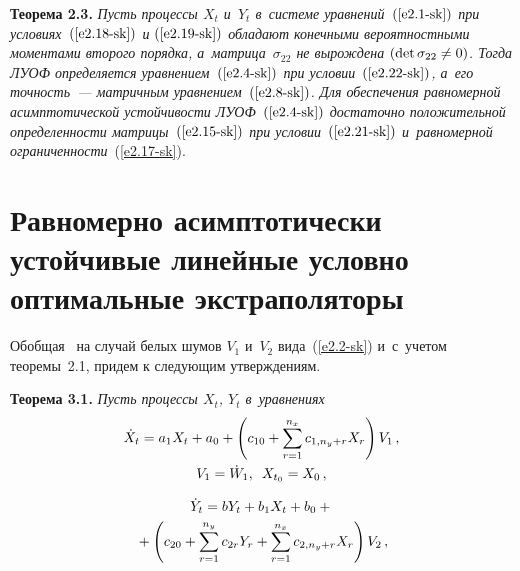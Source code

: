 \begin{multicols}{2}
\noindent
\textbf{Теорема 2.3.} \textit{Пусть процессы  $X_t$ и~$Y_t$ в~системе
уравнений~$(\ref{e2.1-sk})$ при условиях~$(\ref{e2.18-sk})$ и
$(\ref{e2.19-sk})$ обладают конечными вероятностными моментами второго порядка,
а~мат\-ри\-ца~$\sigma_{22}$ не вырождена $(\mathrm{det}\, \sigma_{22}\hm\ne 0)$.
Тогда ЛУОФ определяется уравнением~$(\ref{e2.4-sk})$
при условии~$(\ref{e2.22-sk})$, а~его точность~--- матричным
уравнением~$(\ref{e2.8-sk})$. Для обеспечения равномерной асимптотической
устойчивости ЛУОФ~$(\ref{e2.4-sk})$ достаточно положительной опре\-де\-лен\-ности
матрицы~$(\ref{e2.15-sk})$ при условии~$(\ref{e2.21-sk})$
и~равномерной ограниченности}~(\ref{e2.17-sk}).


\section{Равномерно асимптотически  устойчивые линейные условно
оптимальные экстраполяторы}


Обобщая~\cite{1-sk, 3-sk} на случай белых шумов $V_1$ и~$V_2$ вида~(\ref{e2.2-sk})
и~с~учетом теоремы~2.1, придем к сле\-ду\-ющим утверждениям.

\smallskip

\noindent
\textbf{Теорема 3.1.}
\textit{Пусть процессы $X_t$, $Y_t$ в~уравнениях}
\begin{gather*}
     \dot X_t = a_{1} X_t + a_{0}    + \left( c_{10}
     +\sum\limits_{r=1}^{n_x} c_{1, n_y+r} X_{r}\right)V_1\,,\\
     V_1 = \dot W_1,\enskip X_{t_0}=X_0\,,
     \end{gather*}

     \vspace*{-12pt}

     \noindent
     \begin{multline*}
     \dot Y_t = b Y_t + b_{1} X_t + b_{0} + {}\\
     {}+
     \left( c_{20} +\sum\limits_{r=1}^{n_y} c_{2r} Y_{r}
     +\sum\limits_{r=1}^{n_x} c_{2, n_y+r} X_{r}\right)V_2\,,
          \end{multline*}

          \vspace*{-6pt}


\end{multicols}
